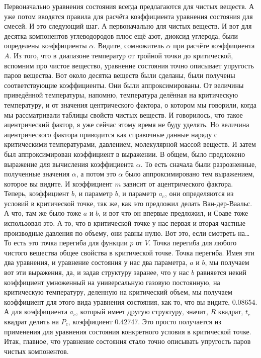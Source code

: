 \documentclass[main.tex]{subfiles}
\begin{document}
Первоначально уравнения состояния всегда предлагаются для чистых веществ.
А уже потом вводятся правила для расчёта коэффициента уравнения состояния для смесей.
И это следующий шаг.
А первоначально для чистых веществ.
И вот для десятка компонентов углеводородов плюс ещё азот, диоксид углерода, были определены коэффициенты $\alpha$.
Видите, сомножитель $\alpha$ при расчёте коэффициента $A$.
Из того, что в диапазоне температур от тройной точки до критической, вспомним про чистое вещество, уравнение состояния точно описывает упругость паров вещества.
Вот около десятка веществ были сделаны, были получены соответствующие коэффициенты.
Они были аппроксимированы.
От величины приведённой температуры, напомню, температура делённая на критическую температуру,
и от значения центрического фактора, о котором мы говорили, когда мы рассматривали таблицы свойств чистых веществ.
И говорилось, что такое ацентрический фактор, я уже сейчас этому время не буду уделять.
Но величина ацентрического фактора приводится как справочные данные наряду с критическими температурами, давлением, молекулярной массой веществ.
И затем был аппроксимирован коэффициент в выражении.
В общем, было предложено выражение для вычисления коэффициента $\alpha$.
То есть сначала были разрозненные, полученные значения $\alpha$, а потом это $\alpha$ было аппроксимировано тем выражением, которое вы видите.
И коэффициент $m$ зависит от ацентрического фактора.
Теперь, коэффициент $b$, и параметр $b$, и параметр $a_c$, они определяются из условий в критической точке, так же, как это предложил делать Ван-дер-Ваальс.
А что, там же было тоже $a$ и $b$, и вот что он впервые предложил, и Соаве тоже использовал это.
А то, что в критической точке у нас первая и вторая частные производные давления по объему, они равны нулю.
Вот это, если смотреть на…
То есть это точка перегиба для функции $p$ от $V$.
Точка перегиба для любого чистого вещества общее свойства в критической точке.
Точка перегиба.
Имея эти два уравнения, и уравнение состояния у нас два параметра, $a$ и $b$, мы получаем вот эти выражения, да, и задав структуру заранее, что у нас $b$ равняется некий коэффициент умноженный на универсальную газовую постоянную, на критическую температуру, деленную на критический объем, мы получаем коэффициент для этого вида уравнения состояния, как то, что вы видите, 0.08654.
А для коэффициента $a_c$, который имеет другую структуру, значит, $R$ квадрат, $t_c$ квадрат делить на $P_c$, коэффициент 0.42747.
Это просто получается из применения для уравнения состояния конкретного условия в критической точке.
Итак, главное, что уравнение состояния стало точно описывать упругость паров чистых компонентов.
\end{document}

